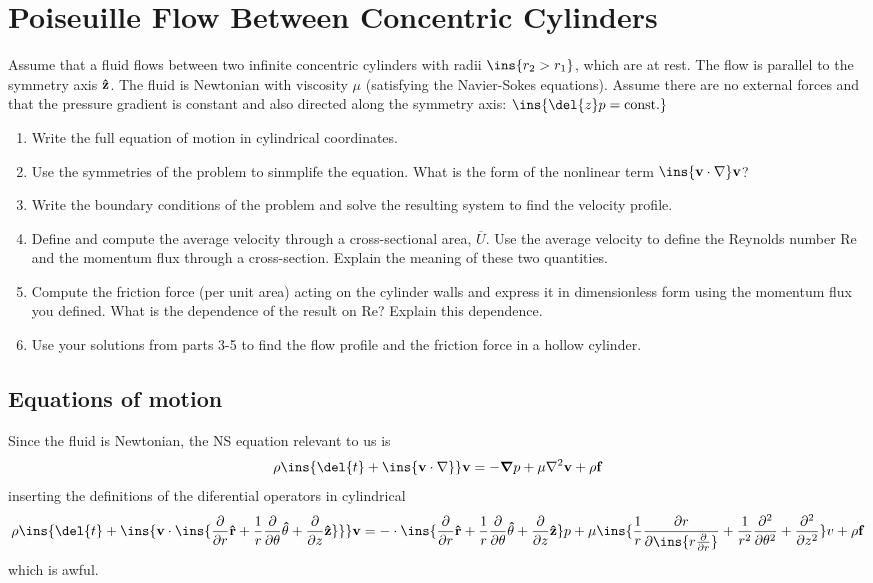 \clearpage
\section{Poiseuille Flow Between Concentric Cylinders}
\begin{colbox}
    Assume that a fluid flows between two infinite concentric cylinders with radii \(\ins{r_2 > r_1}\), which are at rest. The flow is parallel to the symmetry axis \(\vu{z}\). The fluid is Newtonian with viscosity \(\mu\) (satisfying the Navier-Sokes equations). Assume there are no external forces and that the pressure gradient is constant and also directed along the symmetry axis: \(\ins{\del{z}p=\text{const.}}\)
    \begin{enumerate}
        \item Write the full equation of motion in cylindrical coordinates.
        \item Use the symmetries of the problem to sinmplife the equation. What is the form of the nonlinear term \(\ins{\vb{v}\cdot\nabla}\vb{v}\)?
        \item Write the boundary conditions of the problem and solve the resulting system to find the velocity profile.
        \item Define and compute the average velocity through a cross-sectional area, \(\overline{U}\). Use the average velocity to define the Reynolds number Re and the momentum flux through a cross-section. Explain the meaning of these two quantities.
        \item Compute the friction force (per unit area) acting on the cylinder walls and express it in dimensionless form using the momentum flux you defined. What is the dependence of the result on Re? Explain this dependence.
        \item Use your solutions from parts 3-5 to find the flow profile and the friction force in a hollow cylinder.
    \end{enumerate}
\end{colbox}
\subsection{Equations of motion}
Since the fluid is Newtonian, the NS equation relevant to us is
\begin{equation}
    \rho\ins{\del{t}+\ins{\vb{v}\cdot\nabla}}\vb{v} = -\grad{p}+\mu\laplacian{\vb{v}}+\rho\vb{f}
\end{equation}
inserting the definitions of the diferential operators in cylindrical
\begin{equation}
    \rho\ins{\del{t}+\ins{\vb{v}\cdot\ins{\pdv{r}\vu{r}+\frac{1}{r}\pdv{\theta}\vu{\theta}+\pdv{z}\vu{z}}}}\vb{v} = -\cdot\ins{\pdv{r}\vu{r}+\frac{1}{r}\pdv{\theta}\vu{\theta}+\pdv{z}\vu{z}}p+\mu\ins{\frac{1}{r}\pdv{r}\ins{r\pdv{r}}+\frac{1}{r^2}\pdv[2]{\theta}+\pdv[2]{z}}v+\rho\vb{f}
\end{equation}
which is awful.

